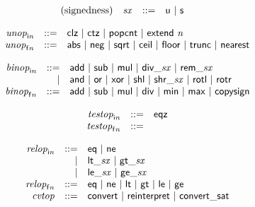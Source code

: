 \vspace{1ex}

$$
\begin{array}{@{}lrrl@{}l@{}}
\mbox{(signedness)} & {\mathit{sx}} &::=& \mathsf{u} ~|~ \mathsf{s} \\
\end{array}
$$

$$
\begin{array}{@{}lrrl@{}l@{}}
& {{\mathit{unop}}}_{{\mathsf{i}}{{\mathit{n}}}} &::=& \mathsf{clz} ~|~ \mathsf{ctz} ~|~ \mathsf{popcnt} ~|~ \mathsf{extend}~{\mathit{n}} \\
& {{\mathit{unop}}}_{{\mathsf{f}}{{\mathit{n}}}} &::=& \mathsf{abs} ~|~ \mathsf{neg} ~|~ \mathsf{sqrt} ~|~ \mathsf{ceil} ~|~ \mathsf{floor} ~|~ \mathsf{trunc} ~|~ \mathsf{nearest} \\
\end{array}
$$

$$
\begin{array}{@{}lrrl@{}l@{}}
& {{\mathit{binop}}}_{{\mathsf{i}}{{\mathit{n}}}} &::=& \mathsf{add} ~|~ \mathsf{sub} ~|~ \mathsf{mul} ~|~ {\mathsf{div\_}}{{\mathit{sx}}} ~|~ {\mathsf{rem\_}}{{\mathit{sx}}} \\ &&|&
\mathsf{and} ~|~ \mathsf{or} ~|~ \mathsf{xor} ~|~ \mathsf{shl} ~|~ {\mathsf{shr\_}}{{\mathit{sx}}} ~|~ \mathsf{rotl} ~|~ \mathsf{rotr} \\
& {{\mathit{binop}}}_{{\mathsf{f}}{{\mathit{n}}}} &::=& \mathsf{add} ~|~ \mathsf{sub} ~|~ \mathsf{mul} ~|~ \mathsf{div} ~|~ \mathsf{min} ~|~ \mathsf{max} ~|~ \mathsf{copysign} \\
\end{array}
$$

$$
\begin{array}{@{}lrrl@{}l@{}}
& {{\mathit{testop}}}_{{\mathsf{i}}{{\mathit{n}}}} &::=& \mathsf{eqz} \\
& {{\mathit{testop}}}_{{\mathsf{f}}{{\mathit{n}}}} &::=&  \\
\end{array}
$$

$$
\begin{array}{@{}lrrl@{}l@{}}
& {{\mathit{relop}}}_{{\mathsf{i}}{{\mathit{n}}}} &::=& \mathsf{eq} ~|~ \mathsf{ne} \\ &&|&
{\mathsf{lt\_}}{{\mathit{sx}}} ~|~ {\mathsf{gt\_}}{{\mathit{sx}}} \\ &&|&
{\mathsf{le\_}}{{\mathit{sx}}} ~|~ {\mathsf{ge\_}}{{\mathit{sx}}} \\
& {{\mathit{relop}}}_{{\mathsf{f}}{{\mathit{n}}}} &::=& \mathsf{eq} ~|~ \mathsf{ne} ~|~ \mathsf{lt} ~|~ \mathsf{gt} ~|~ \mathsf{le} ~|~ \mathsf{ge} \\
& {\mathit{cvtop}} &::=& \mathsf{convert} ~|~ \mathsf{reinterpret} ~|~ \mathsf{convert\_sat} \\
\end{array}
$$


